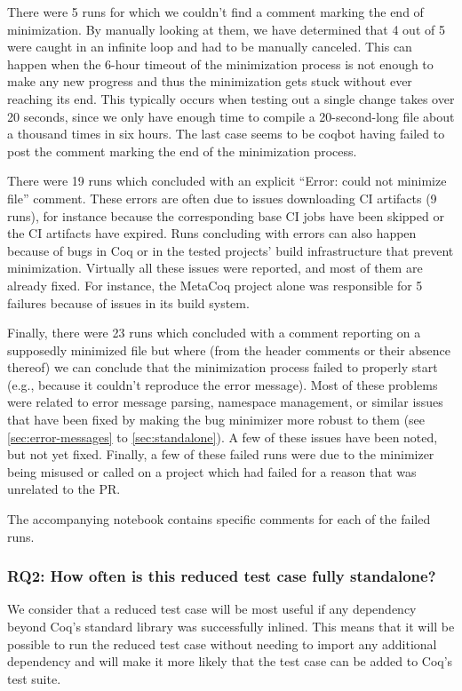 \documentclass[a4paper,USenglish,cleveref,autoref,thm-restate]{lipics-v2021}
\begin{document}
There were 5 runs for which we couldn't find a comment marking the end of minimization. By manually looking at them, we have determined that 4 out of 5 were caught in an infinite loop and had to be manually canceled. This can happen when the 6-hour timeout of the minimization process is not enough to make any new progress and thus the minimization gets stuck without ever reaching its end. This typically occurs when testing out a single change takes over 20 seconds, since we only have enough time to compile a 20-second-long file about a thousand times in six hours. The last case seems to be coqbot having failed to post the comment marking the end of the minimization process.

There were 19 runs which concluded with an explicit ``Error: could not minimize file'' comment. These errors are often due to issues downloading CI artifacts (9 runs), for instance because the corresponding base CI jobs have been skipped or the CI artifacts have expired. Runs concluding with errors can also happen because of bugs in Coq or in the tested projects' build infrastructure that prevent minimization. Virtually all these issues were reported, and most of them are already fixed. For instance, the MetaCoq project alone was responsible for 5 failures because of issues in its build system.

Finally, there were 23 runs which concluded with a comment reporting on a supposedly minimized file but where (from the header comments or their absence thereof) we can conclude that the minimization process failed to properly start (e.g., because it couldn't reproduce the error message). Most of these problems were related to error message parsing, namespace management, or similar issues that have been fixed by making the bug minimizer more robust to them (see \autoref{sec:error-messages} to \autoref{sec:standalone}). A few of these issues have been noted, but not yet fixed. Finally, a few of these failed runs were due to the minimizer being misused or called on a project which had failed for a reason that was unrelated to the PR.

The accompanying notebook contains specific comments for each of the failed runs.

\subsubsection{RQ2: How often is this reduced test case fully standalone?}

We consider that a reduced test case will be most useful if any dependency beyond Coq's standard library was successfully inlined. This means that it will be possible to run the reduced test case without needing to import any additional dependency and will make it more likely that the test case can be added to Coq's test suite.
\end{document}
